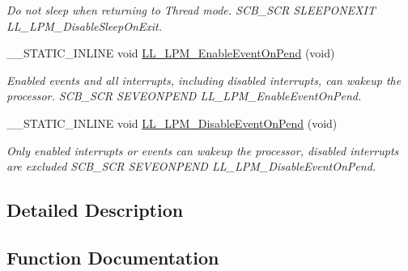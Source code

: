 \begin{DoxyCompactItemize}
\begin{DoxyCompactList}\small\item\em Do not sleep when returning to Thread mode.  S\+C\+B\+\_\+\+S\+CR S\+L\+E\+E\+P\+O\+N\+E\+X\+IT L\+L\+\_\+\+L\+P\+M\+\_\+\+Disable\+Sleep\+On\+Exit. \end{DoxyCompactList}\item 
\+\_\+\+\_\+\+S\+T\+A\+T\+I\+C\+\_\+\+I\+N\+L\+I\+NE void \hyperlink{group___c_o_r_t_e_x___l_l___e_f___l_o_w___p_o_w_e_r___m_o_d_e_gaf1c01ae00b4a13c5b6531f82a9677b90}{L\+L\+\_\+\+L\+P\+M\+\_\+\+Enable\+Event\+On\+Pend} (void)
\begin{DoxyCompactList}\small\item\em Enabled events and all interrupts, including disabled interrupts, can wakeup the processor.  S\+C\+B\+\_\+\+S\+CR S\+E\+V\+E\+O\+N\+P\+E\+ND L\+L\+\_\+\+L\+P\+M\+\_\+\+Enable\+Event\+On\+Pend. \end{DoxyCompactList}\item 
\+\_\+\+\_\+\+S\+T\+A\+T\+I\+C\+\_\+\+I\+N\+L\+I\+NE void \hyperlink{group___c_o_r_t_e_x___l_l___e_f___l_o_w___p_o_w_e_r___m_o_d_e_gaf4ebb8351f09676067aa0ce1fe08321b}{L\+L\+\_\+\+L\+P\+M\+\_\+\+Disable\+Event\+On\+Pend} (void)
\begin{DoxyCompactList}\small\item\em Only enabled interrupts or events can wakeup the processor, disabled interrupts are excluded  S\+C\+B\+\_\+\+S\+CR S\+E\+V\+E\+O\+N\+P\+E\+ND L\+L\+\_\+\+L\+P\+M\+\_\+\+Disable\+Event\+On\+Pend. \end{DoxyCompactList}\end{DoxyCompactItemize}


\subsection{Detailed Description}


\subsection{Function Documentation}
\mbox{\label{group___c_o_r_t_e_x___l_l___e_f___l_o_w___p_o_w_e_r___m_o_d_e_gaf4ebb8351f09676067aa0ce1fe08321b}} 
